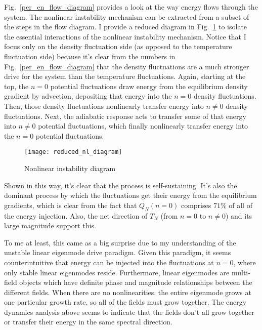 Fig.~\ref{per_en_flow_diagram} provides a look at the way energy flows through the system. The nonlinear instability mechanism can be extracted from a subset of the steps in the flow diagram.
I provide a reduced diagram in Fig.~\ref{reduced_nl_diagram} to isolate the essential interactions of the nonlinear instability mechanism. Notice that I focus only on the density fluctuation
side (as opposed to the temperature fluctuation side) because it's clear from the numbers in Fig.~\ref{per_en_flow_diagram} that the density fluctuations are a much stronger drive for
the system than the temperature fluctuations. Again, starting at the top, the $n=0$ potential fluctuations draw energy from the equilibrium density gradient by advection, depositing that
energy into the $n=0$ density fluctuations. Then, those density fluctuations nonlinearly transfer energy into $n \ne 0$ density fluctuations. Next, the adiabatic response acts to transfer
some of that energy into $n \ne 0$ potential fluctuations, which finally nonlinearly transfer energy into the $n=0$ potential fluctuations.

\begin{figure}[!ht]
\centerline{\texttt{[image: reduced\_nl\_diagram]}}
\caption{Nonlinear instability diagram}
\label{reduced_nl_diagram}
\end{figure}

Shown in this way, it's clear that the process is self-sustaining. It's also the dominant process by which the fluctuations get their energy from the equilibrium gradients, which is clear
from the fact that $Q_N(n=0)$ comprises $71 \%$ of all of the energy injection. Also, the net direction of $T_N$ (from $n=0$ to $n \ne 0$) and its large magnitude support this.
 
To me at least, this came as a big surprise due to my understanding of the unstable linear eigenmode drive paradigm.
Given this paradigm, it seems counterintuitive that energy can be injected into the fluctuations at $n=0$, where only
stable linear eigenmodes reside. Furthermore, linear eigenmodes are multi-field objects which have definite phase and magnitude relationships between the different fields. When there are no
nonlinearities, the entire eigenmode grows at one particular growth rate, so all of the fields must grow together. The energy dynamics analysis above seems to indicate that the fields
don't all grow together or transfer their energy in the same spectral direction.

